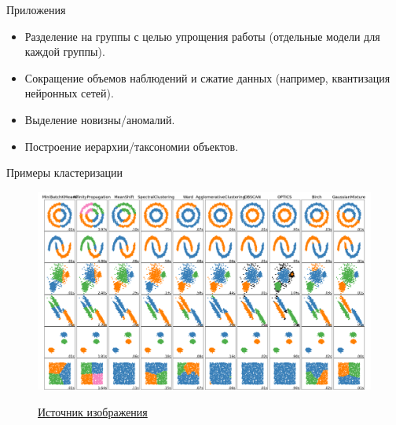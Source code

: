 \documentclass{beamer}
\begin{document}
\begin{frame}{Приложения}
    \small
    
    \begin{itemize}
        \item Разделение на группы с целью упрощения работы (отдельные модели для каждой группы).
        \item Сокращение объемов наблюдений и сжатие данных (например, квантизация нейронных сетей).
        \item Выделение новизны/аномалий.
        \item Построение иерархии/таксономии объектов.
    \end{itemize}
\end{frame}

\begin{frame}{Примеры кластеризации}
    \small

    \begin{figure}
        \centering
        \includegraphics[width=\linewidth]{sklearn_clust.png}
        
        \href{https://scikit-learn.org/stable/modules/clustering.html}{Источник изображения}
    \end{figure}
\end{frame}
\end{document}

